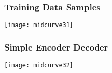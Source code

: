 \begin{frame}[fragile]\frametitle{Training Data Samples}

\begin{center}
\texttt{[image: midcurve31]}
\end{center}	
\end{frame}




\begin{frame}[fragile]\frametitle{Simple Encoder Decoder}

\begin{center}
\texttt{[image: midcurve32]}
\end{center}	
\end{frame}

